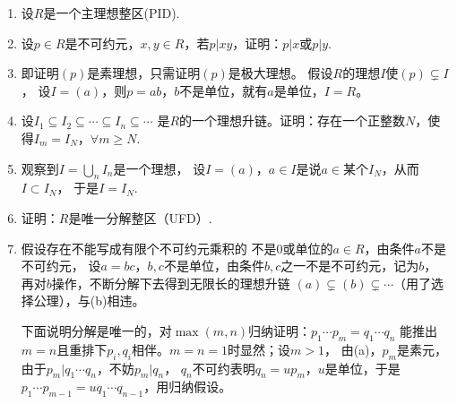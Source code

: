 \begin{enumerate}
    \item[2.2]设$R$是一个主理想整区(PID).
    \item[(a)] 设$p\in R$是不可约元，$x,y\in R$，若$p|xy$，证明：$p|x$或$p|y$.
    \item[\textbf{证明:}] 即证明$(p)$是素理想，只需证明$(p)$是极大理想。
        假设$R$的理想$I$使$(p)\subsetneq I$，
        设$I=(a)$，则$p=ab$，$b$不是单位，就有$a$是单位，$I=R$。
    \item[(b)] 设$I_1\subseteq I_2\subseteq\cdots\subseteq I_n\subseteq\cdots$
        是$R$的一个理想升链。证明：存在一个正整数$N$，使得$I_m=I_N$，$\forall m\ge N$.
    \item[\textbf{证明:}] 观察到$I=\bigcup_n I_n$是一个理想，
        设$I=(a)$，$a\in I$是说$a\in$某个$I_N$，从而$I\subset I_N$，
        于是$I=I_N$.
    \item[(c)] 证明：$R$是唯一分解整区（UFD）.
    \item[\textbf{证明:}] 假设存在不能写成有限个不可约元乘积的
        不是$0$或单位的$a\in R$，由条件$a$不是不可约元，
        设$a=bc$，$b,c$不是单位，由条件$b,c$之一不是不可约元，记为$b$，
        再对$b$操作，不断分解下去得到无限长的理想升链
        $(a)\subsetneq(b)\subsetneq\cdots$（用了选择公理），与(b)相违。

        下面说明分解是唯一的，对$\max(m,n)$归纳证明：$p_1\cdots p_m=q_1\cdots q_n$
        能推出$m=n$且重排下$p_i,q_i$相伴。$m=n=1$时显然；设$m>1$，
        由(a)，$p_m$是素元，由于$p_m|q_1\cdots q_n$，不妨$p_m|q_n$，
        $q_n$不可约表明$q_n=up_m$，$u$是单位，于是
        $p_1\cdots p_{m-1}=uq_1\cdots q_{n-1}$，用归纳假设。


\end{enumerate}
